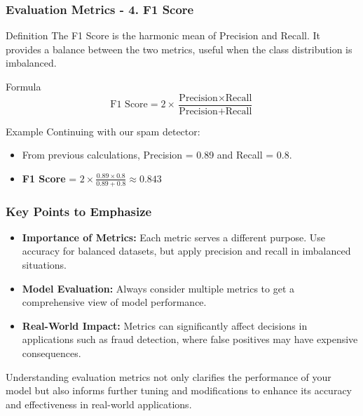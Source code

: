 \documentclass[aspectratio=169]{beamer}
\begin{document}
\begin{frame}[fragile]
    \frametitle{Evaluation Metrics - 4. F1 Score}
    \begin{block}{Definition}
        The F1 Score is the harmonic mean of Precision and Recall. 
        It provides a balance between the two metrics, useful when the class distribution is imbalanced.
    \end{block}

    \begin{block}{Formula}
        \begin{equation}
        \text{F1 Score} = 2 \times \frac{\text{Precision} \times \text{Recall}}{\text{Precision} + \text{Recall}}
        \end{equation}
    \end{block}

    \begin{block}{Example}
        Continuing with our spam detector:
        \begin{itemize}
            \item From previous calculations, Precision = 0.89 and Recall = 0.8.
            \item \textbf{F1 Score} = \( 2 \times \frac{0.89 \times 0.8}{0.89 + 0.8} \approx 0.843 \)
        \end{itemize}
    \end{block}
\end{frame}

\begin{frame}[fragile]
    \frametitle{Key Points to Emphasize}
    \begin{itemize}
        \item \textbf{Importance of Metrics:} Each metric serves a different purpose. Use accuracy for balanced datasets, but apply precision and recall in imbalanced situations.
        \item \textbf{Model Evaluation:} Always consider multiple metrics to get a comprehensive view of model performance.
        \item \textbf{Real-World Impact:} Metrics can significantly affect decisions in applications such as fraud detection, where false positives may have expensive consequences.
    \end{itemize}
    
    Understanding evaluation metrics not only clarifies the performance of your model but also informs further tuning and modifications to enhance its accuracy and effectiveness in real-world applications.
\end{frame}
\end{document}
